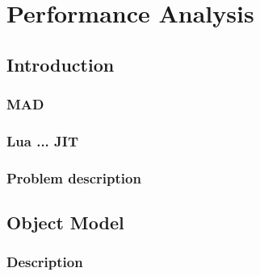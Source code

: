 \documentclass[12pt, oneside]{Thesis}
\begin{document}




\mainmatter
\pagestyle{fancy}

\part{Performance Analysis}
\label{Part:mad}

  \chapter{Introduction}
  \label{Chapt:Intro}

    \section{MAD}
    \label{Sec:mad}
    

    \section{Lua ... JIT}
    \label{Sec:LuaJIT}
    

    \section{Problem description}
    \label{Sec:Problem-description}
    

  \chapter{Object Model}
  \label{Chapt:MO}
  

    \section{Description}
    \label{Sec:MO-descriptinon}
    
\end{document}
